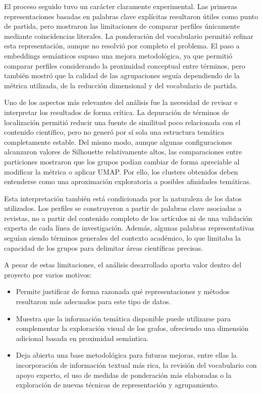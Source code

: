 \documentclass[11pt,spanish,listoffigures,listoftables]{tfgetsinf}
\begin{document}
El proceso seguido tuvo un carácter claramente experimental. Las primeras representaciones basadas en palabras clave explícitas resultaron útiles como punto de partida, pero mostraron las limitaciones de comparar perfiles únicamente mediante coincidencias literales. La ponderación del vocabulario permitió refinar esta representación, aunque no resolvió por completo el problema. El paso a embeddings semánticos supuso una mejora metodológica, ya que permitió comparar perfiles considerando la proximidad conceptual entre términos, pero también mostró que la calidad de las agrupaciones seguía dependiendo de la métrica utilizada, de la reducción dimensional y del vocabulario de partida.

Uno de los aspectos más relevantes del análisis fue la necesidad de revisar e interpretar los resultados de forma crítica. La depuración de términos de localización permitió reducir una fuente de similitud poco relacionada con el contenido científico, pero no generó por sí sola una estructura temática completamente estable. Del mismo modo, aunque algunas configuraciones alcanzaron valores de Silhouette relativamente altos, las comparaciones entre particiones mostraron que los grupos podían cambiar de forma apreciable al modificar la métrica o aplicar UMAP. Por ello, los clusters obtenidos deben entenderse como una aproximación exploratoria a posibles afinidades temáticas.

Esta interpretación también está condicionada por la naturaleza de los datos utilizados. Los perfiles se construyeron a partir de palabras clave asociadas a revistas, no a partir del contenido completo de los artículos ni de una validación experta de cada línea de investigación. Además, algunas palabras representativas seguían siendo términos generales del contexto académico, lo que limitaba la capacidad de los grupos para delimitar áreas científicas precisas.

A pesar de estas limitaciones, el análisis desarrollado aporta valor dentro del proyecto por varios motivos:

\begin{itemize}
    \item Permite justificar de forma razonada qué representaciones y métodos resultaron más adecuados para este tipo de datos.
    
    \item Muestra que la información temática disponible puede utilizarse para complementar la exploración visual de los grafos, ofreciendo una dimensión adicional basada en proximidad semántica.
    
    \item Deja abierta una base metodológica para futuras mejoras, entre ellas la incorporación de información textual más rica, la revisión del vocabulario con apoyo experto, el uso de medidas de ponderación más elaboradas o la exploración de nuevas técnicas de representación y agrupamiento.
\end{itemize}
\end{document}
